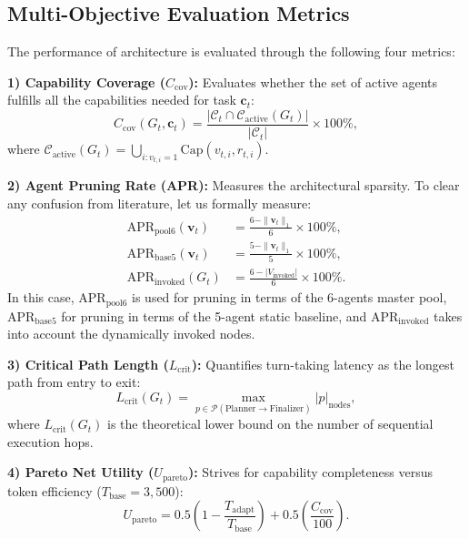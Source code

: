 ﻿\documentclass[conference]{IEEEtran}
\begin{document}
\subsection{Multi-Objective Evaluation Metrics}
The performance of architecture is evaluated through the following four metrics:

\textbf{1) Capability Coverage ($C_{\mathrm{cov}}$):} Evaluates whether the set of active agents fulfills all the capabilities needed for task $\mathbf{c}_t$:
\begin{equation}
C_{\mathrm{cov}}(G_t, \mathbf{c}_t) = \frac{|\mathcal{C}_t \cap \mathcal{C}_{\mathrm{active}}(G_t)|}{|\mathcal{C}_t|} \times 100\%,
\end{equation}
where $\mathcal{C}_{\mathrm{active}}(G_t) = \bigcup_{i: v_{t,i}=1} \mathrm{Cap}(v_{t,i}, r_{t,i})$.

\textbf{2) Agent Pruning Rate (APR):} Measures the architectural sparsity. To clear any confusion from literature, let us formally measure:
\begin{align}
\mathrm{APR}_{\mathrm{pool6}}(\mathbf{v}_t) &= \frac{6 - \|\mathbf{v}_t\|_1}{6} \times 100\%, \label{eq:apr_pool6} \\
\mathrm{APR}_{\mathrm{base5}}(\mathbf{v}_t) &= \frac{5 - \|\mathbf{v}_t\|_1}{5} \times 100\%, \label{eq:apr_base5} \\
\mathrm{APR}_{\mathrm{invoked}}(G_t) &= \frac{6 - |V_{\mathrm{invoked}}|}{6} \times 100\%. \label{eq:apr_invoked}
\end{align}
In this case, $\mathrm{APR}_{\mathrm{pool6}}$ is used for pruning in terms of the 6-agents master pool, $\mathrm{APR}_{\mathrm{base5}}$ for pruning in terms of the 5-agent static baseline, and $\mathrm{APR}_{\mathrm{invoked}}$ takes into account the dynamically invoked nodes.

\textbf{3) Critical Path Length ($L_{\mathrm{crit}}$):} Quantifies turn-taking latency as the longest path from entry to exit:
\begin{equation}
L_{\mathrm{crit}}(G_t) = \max_{p \in \mathcal{P}(\mathrm{Planner} \to \mathrm{Finalizer})} |p|_{\mathrm{nodes}},
\label{eq:critical_path}
\end{equation}
where $L_{\mathrm{crit}}(G_t)$ is the theoretical lower bound on the number of sequential execution hops.

\textbf{4) Pareto Net Utility ($U_{\mathrm{pareto}}$):} Strives for capability completeness versus token efficiency ($T_{\mathrm{base}} = 3,500$):
\begin{equation}
U_{\mathrm{pareto}} = 0.5 \left(1 - \frac{T_{\mathrm{adapt}}}{T_{\mathrm{base}}}\right) + 0.5 \left(\frac{C_{\mathrm{cov}}}{100}\right).
\label{eq:pareto_utility}
\end{equation}
\end{document}
